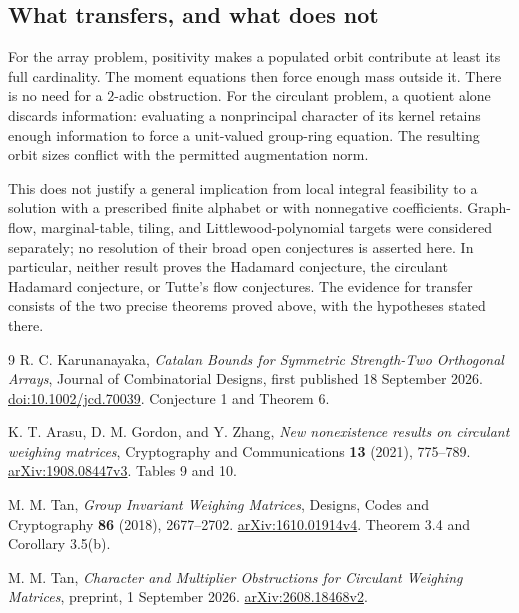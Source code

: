 \documentclass[11pt]{article}
\theoremstyle{remark}
\numberwithin{equation}{section}
\begin{document}
\subsection{What transfers, and what does not}
For the array problem, positivity makes a populated orbit contribute at
least its full cardinality. The moment equations then force enough mass
outside it. There is no need for a $2$-adic obstruction. For the circulant
problem, a quotient alone discards information: evaluating a nonprincipal
character of its kernel retains enough information to force a unit-valued
group-ring equation. The resulting orbit sizes conflict with the permitted
augmentation norm.

This does not justify a general implication from local integral feasibility
to a solution with a prescribed finite alphabet or with nonnegative
coefficients. Graph-flow, marginal-table, tiling, and Littlewood-polynomial
targets were considered separately; no resolution of their broad open
conjectures is asserted here. In particular, neither result proves the
Hadamard conjecture, the circulant Hadamard conjecture, or Tutte's flow
conjectures. The evidence for transfer consists of the two precise theorems
proved above, with the hypotheses stated there.

\begin{thebibliography}{9}
R. C. Karunanayaka,
\emph{Catalan Bounds for Symmetric Strength-Two Orthogonal Arrays},
Journal of Combinatorial Designs, first published 18 September 2026.
\href{https://doi.org/10.1002/jcd.70039}{doi:10.1002/jcd.70039}.
Conjecture 1 and Theorem 6.

K. T. Arasu, D. M. Gordon, and Y. Zhang,
\emph{New nonexistence results on circulant weighing matrices},
Cryptography and Communications \textbf{13} (2021), 775--789.
\href{https://arxiv.org/abs/1908.08447v3}{arXiv:1908.08447v3}.
Tables 9 and 10.

M. M. Tan, \emph{Group Invariant Weighing Matrices},
Designs, Codes and Cryptography \textbf{86} (2018), 2677--2702.
\href{https://arxiv.org/abs/1610.01914v4}{arXiv:1610.01914v4}.
Theorem 3.4 and Corollary 3.5(b).

M. M. Tan,
\emph{Character and Multiplier Obstructions for Circulant Weighing Matrices},
preprint, 1 September 2026.
\href{https://arxiv.org/abs/2608.18468v2}{arXiv:2608.18468v2}.

\end{thebibliography}
\end{document}
